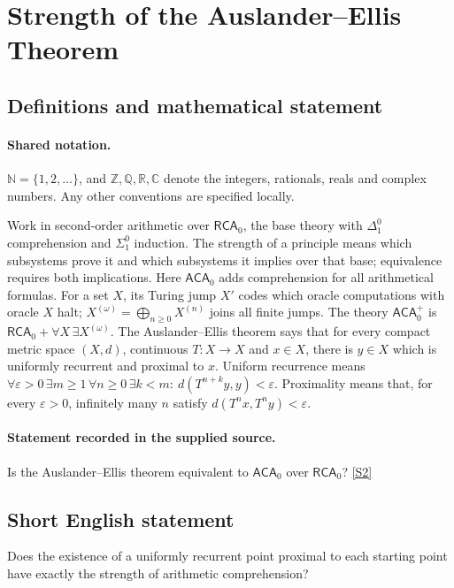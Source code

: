 \documentclass[11pt]{article}
\newcommand{\sref}[2]{\hyperlink{source:#1:#2}{[S#2]}}
\begin{document}
\section{Strength of the Auslander–Ellis Theorem}\label{statement}

\subsection{Definitions and mathematical statement}

\paragraph{Shared notation.}$\mathbb N=\{1,2,\ldots\}$, and $\mathbb Z,\mathbb Q,\mathbb R,\mathbb C$ denote the integers, rationals, reals and complex numbers. Any other conventions are specified locally.


Work in second-order arithmetic over $\mathsf{RCA}_0$, the base theory with $\Delta^0_1$ comprehension and $\Sigma^0_1$ induction. The strength of a principle means which subsystems prove it and which subsystems it implies over that base; equivalence requires both implications.  Here $\mathsf{ACA}_0$ adds comprehension for all arithmetical formulas. For a set $X$, its Turing jump $X'$ codes which oracle computations with oracle $X$ halt; $X^{(\omega)}=\bigoplus_{n\geq0}X^{(n)}$ joins all finite jumps. The theory $\mathsf{ACA}_0^+$ is $\mathsf{RCA}_0+\forall X\,\exists X^{(\omega)}$. The Auslander--Ellis theorem says that for every compact metric space $(X,d)$, continuous $T:X\to X$ and $x\in X$, there is $y\in X$ which is uniformly recurrent and proximal to $x$. Uniform recurrence means $\forall\varepsilon>0\,\exists m\geq1\,\forall n\geq0\,\exists k<m:\ d(T^{n+k}y,y)<\varepsilon$. Proximality means that, for every $\varepsilon>0$, infinitely many $n$ satisfy $d(T^nx,T^ny)<\varepsilon$.
\paragraph{Statement recorded in the supplied source.}
Is the Auslander--Ellis theorem equivalent to $\mathsf{ACA}_0$ over $\mathsf{RCA}_0$? \sref{statement}{2}
\subsection{Short English statement}
Does the existence of a uniformly recurrent point proximal to each starting point have exactly the strength of arithmetic comprehension?
\end{document}
